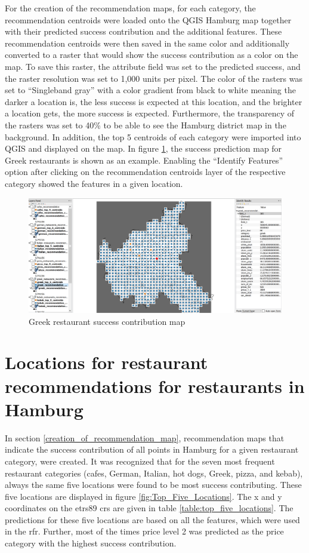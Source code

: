 \documentclass[a4paper, 11pt, oneside]{Thesis}  %
\begin{document}
For the creation of the recommendation maps, for each category, the recommendation centroids were loaded onto the QGIS Hamburg map together with their predicted success contribution and the additional features. These recommendation centroids were then saved in the same color and additionally converted to a raster that would show the success contribution as a color on the map. To save this raster, the attribute field was set to the predicted success, and the raster resolution was set to 1,000 units per pixel. The color of the rasters was set to ``Singleband gray'' with a color gradient from black to white meaning the darker a location is, the less success is expected at this location, and the brighter a location gets, the more success is expected. Furthermore, the transparency of the rasters was set to 40\% to be able to see the Hamburg district map in the background. In addition, the top 5 centroids of each category were imported into QGIS and displayed on the map. In figure \ref{fig:Greek_restaurant_success_contribution_map}, the success prediction map for Greek restaurants is shown as an example. Enabling the ``Identify Features'' option after clicking on the recommendation centroids layer of the respective category showed the features in a given location.

\begin{figure}[h]
\includegraphics[scale=0.5]{Figures/Recommendation_map/greek_restaurant_recommendation_map.png}
\centering
\caption{Greek restaurant success contribution map}
\label{fig:Greek_restaurant_success_contribution_map}
\end{figure}

\section{Locations for restaurant recommendations for restaurants in Hamburg}

In section \ref{creation_of_recommendation_map}, recommendation maps that indicate the success contribution of all points in Hamburg for a given restaurant category, were created. It was recognized that for the seven most frequent restaurant categories (cafes, German, Italian, hot dogs, Greek, pizza, and kebab), always the same five locations were found to be most success contributing. These five locations are displayed in figure \ref{fig:Top_Five_Locations}. The x and y coordinates on the \ac{etrs89} \ac{crs} are given in table \ref{table:top_five_locations}. The predictions for these five locations are based on all the features, which were used in the \ac{rfr}. Further, most of the times price level 2 was predicted as the price category with the highest success contribution.
\end{document}

